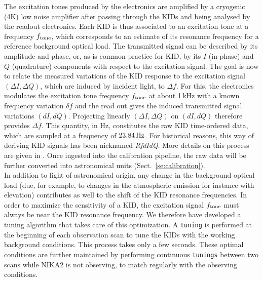The excitation tones produced by the electronics are amplified by a
cryogenic (4K) low noise amplifier after passing through the KIDs and
being analysed by the readout electronics. {\lp Each KID is thus
associated to an excitation tone at a frequency $f_{\rm{tone}}$, which
corresponds to an estimate of its resonance frequency for a reference
background optical load.}
The transmitted signal can be described by its
amplitude and phase, or, as is common practice for KID, by its $I$
(in-phase) and $Q$ (quadrature) components
with respect to the excitation signal.
The goal is now to relate the measured variations of the KID response
to the excitation signal $(\Delta I, \Delta Q)$, which are induced by incident light, to
$\Delta f$. For this, the electronics modulates the excitation tone
frequency $f_{\rm{tone}}$ at about 1\,kHz with a known frequency variation $\delta f$
and the read out gives the induced transmitted signal variations
$(dI, dQ)$. Projecting linearly $(\Delta I, \Delta Q)$ on $(dI, dQ)$ therefore
provides $\Delta f$. This quantity, in Hz, constitutes the raw KID
time-ordered data, which are sampled at a frequency of
$23.84\,\rm{Hz}$. For historical reasons, this way of deriving KID
signals has been nicknamed \emph{RfdIdQ}. More details on this process
are given in \citet{Calvo2013}.
Once ingested into the calibration pipeline, the raw data will be further converted
into astronomical units (Sect.~\ref{se:calibration}).\\


In addition to light of astronomical origin, any change in the
background optical load (due, for example, to changes in
the atmospheric emission for instance with elevation) contributes as well to
the shift of the KID resonance frequencies. In
order to maximize the sensitivity of a KID, the excitation signal $f_{\rm{tone}}$
must always be near the KID resonance frequency. We therefore have
developed a tuning algorithm that takes care of
this optimization. A {\tt tuning} is performed at the beginning
of each observation scan to tune the KIDs with the working background
conditions.
This process takes only a few seconds.
These optimal conditions are further maintained by performing
continuous {\tt tunings} between two scans while NIKA2 is not observing, to
match regularly with the observing conditions.

